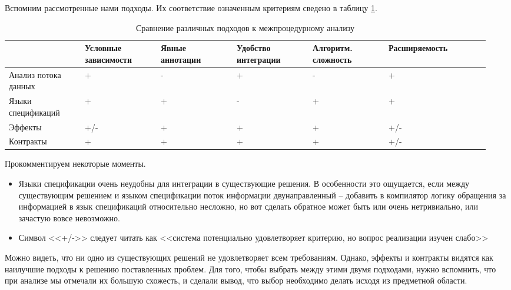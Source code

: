 Вспомним рассмотренные нами подходы. Их соответствие означенным критериям сведено в таблицу \ref{approaches-analysis}.

\begin{table}[h]
\begin{tabular}{ | p{0.15\linewidth} | p{0.15\linewidth} | p{0.15\linewidth} | p{0.15\linewidth} | p{0.15\linewidth} | p{0.20\linewidth} | }
  \hline
               & Условные зависимости & Явные аннотации            & Удобство интеграции & Алгоритм. сложность & Расширяемость \\\hline

  Анализ потока данных &   +          & -               & +           & -               & +          \\\hline

  Языки спецификаций   & +          & +               & -           & +               & +         \\\hline

  Эффекты           & +/-           & +               & +           & +               & +/-          \\\hline

  Контракты         & +           & +               & +           & +               & +/-         \\\hline
\end{tabular}
\caption{Сравнение различных подходов к межпроцедурному анализу}
\label{approaches-analysis}
\end{table}

Прокомментируем некоторые моменты.

\begin{itemize}
  \item Языки спецификации очень неудобны для интеграции в существующие решения. В особенности это ощущается, если между существующим решением и языком спецификации поток информации двунаправленный -- добавить в компилятор логику обращения за информацией в язык спецификаций относительно несложно, но вот сделать обратное может быть или очень нетривиально, или зачастую вовсе невозможно.

  \item Символ <<+/->> следует читать как <<система потенциально удовлетворяет критерию, но вопрос реализации изучен слабо>>
\end{itemize}

Можно видеть, что ни одно из существующих решений не удовлетворяет всем требованиям. Однако, эффекты и контракты видятся как наилучшие подходы к решению поставленных проблем. Для того, чтобы выбрать между этими двумя подходами, нужно вспомнить, что при анализе мы отмечали их большую схожесть, и сделали вывод, что выбор необходимо делать исходя из предметной области.

